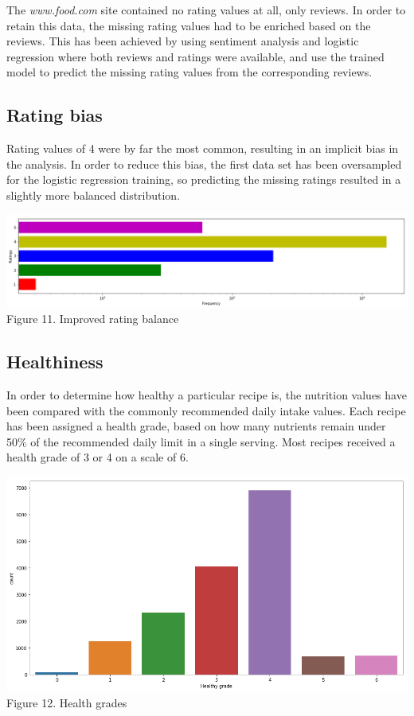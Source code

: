 \documentclass[11pt]{article}
\begin{document}
The \textit{www.food.com} site contained no rating values at all, only reviews. In order to retain this data, the missing rating values had to be enriched based on the reviews. This has been achieved by using sentiment analysis and logistic regression where both reviews and ratings were available, and use the trained model to predict the missing rating values from the corresponding reviews.

\subsection{Rating bias}

Rating values of 4 were by far the most common, resulting in an implicit bias in the analysis. In order to reduce this bias, the first data set has been oversampled for the logistic regression training, so predicting the missing ratings resulted in a slightly more balanced distribution.

\vspace{5mm}
\begin{center}
\includegraphics[scale=0.18]{rating-balanced}
\label{rating-balanced} Figure 11. Improved rating balance
\end{center}
\vspace{5mm}

\subsection{Healthiness}

In order to determine how healthy a particular recipe is, the nutrition values have been compared with the commonly recommended daily intake values. Each recipe has been assigned a health grade, based on how many nutrients remain under 50\% of the recommended daily limit in a single serving. Most recipes received a health grade of 3 or 4 on a scale of 6.

\vspace{5mm}
\begin{center}
\includegraphics[scale=0.22]{health-grade}
\label{health-grade} Figure 12. Health grades
\end{center}
\vspace{5mm}
\end{document}
